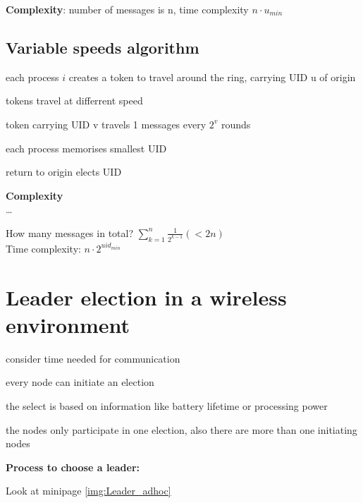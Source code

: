 \textbf{Complexity}: number of messages is n, time complexity $n\cdot u_{min}$

\subsection{Variable speeds algorithm}
\begin{compactitem}
\item each process $i$ creates a token to travel around the ring, carrying UID u of origin
\item tokens travel at differrent speed
\item token carrying UID v travels  1 messages every $2^{v}$ rounds
\item each process memorises smallest UID
\item return to origin elects UID
\end{compactitem}

\textbf{Complexity}\\
\dots


How many messages in total? $\sum\limits_{k=1}^n \frac{1}{2^{k-1}} (<2n)$\\
Time complexity: $n\cdot 2^{{uid}_{min}}$

\section{Leader election in a wireless environment}
\begin{compactitem}
\item consider time needed for communication
\item every node can initiate an election
\item the select is based on information like battery lifetime or processing power
\item the nodes only participate in one election, also there are more than one initiating nodes
\end{compactitem}

\textbf{Process to choose a leader:}

Look at minipage \ref{img:Leader_adhoc}

